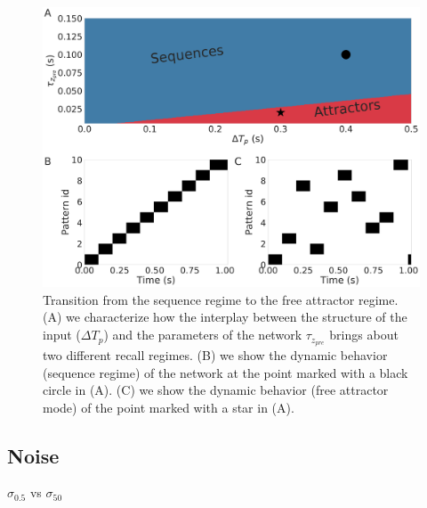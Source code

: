 \documentclass[10pt,a4paper]{article}
\begin{document}
\begin{figure}[H]
\centering
 \includegraphics[scale=0.20]{attractor_vs_sequence.pdf}
\caption{Transition from the sequence regime to the free attractor regime. (A) we characterize how the interplay between the structure of the input ($\Delta T_p$) and the parameters of the network $\tau_{z_{pre}}$ brings about two different recall regimes. (B) we show the dynamic behavior (sequence regime) of the network at the point marked with a black circle in (A). (C) we show the dynamic behavior (free attractor mode) of the point marked with a star in (A).}
\label{fig:attractors}
\end{figure}

\subsection{Noise}

$\sigma_{0.5}$ vs 
$\sigma_{50}$
\end{document}
